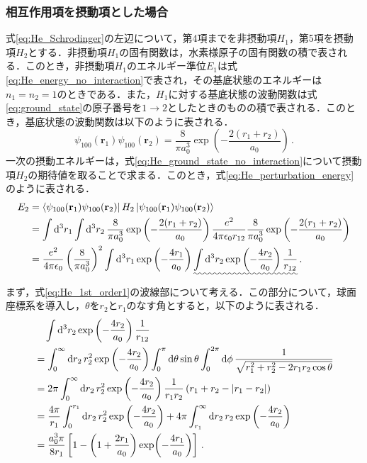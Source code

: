 \documentclass[a4paper,dvipdfmx,10.5pt]{jarticle}
\begin{document}
\subsubsection{相互作用項を摂動項とした場合}
式\eqref{eq:He_Schrodinger}の左辺について，第4項までを非摂動項$H_1$，第5項を摂動項$H_2$とする．非摂動項$H_1$の固有関数は，水素様原子の固有関数の積で表される．このとき，非摂動項$H_1$のエネルギー準位$E_1$は式\eqref{eq:He_energy_no_interaction}で表され，その基底状態のエネルギーは$n_1=n_2=1$のときである．また，$H_1$に対する基底状態の波動関数は式\eqref{eq:ground_state}の原子番号を$1\to 2$としたときのものの積で表される．このとき，基底状態の波動関数は以下のように表される．
\begin{equation}
  \psi_{100}(\mathbf{r}_1)\psi_{100}(\mathbf{r}_2) = \frac{8}{\pi a_0^3} \exp\left(-\frac{2(r_1 + r_2)}{a_0}\right)\,.\label{eq:He_ground_state_no_interaction} 
\end{equation}
一次の摂動エネルギーは，式\eqref{eq:He_ground_state_no_interaction}について摂動項$H_2$の期待値を取ることで求まる．このとき，式\eqref{eq:He_perturbation_energy}のように表される．
\begin{align}
  E_2&= \bra{\psi_{100}(\mathbf{r}_1)\psi_{100}(\mathbf{r}_2)} H_2 \ket{\psi_{100}(\mathbf{r}_1)\psi_{100}(\mathbf{r}_2)}\label{eq:He_perturbation_energy_1}\\
  &= \int \dd[3]{r_1} \int \dd[3]{r_2} \frac{8}{\pi a_0^3} \exp\left(-\frac{2(r_1 + r_2)}{a_0}\right) \frac{e^2}{4\pi \epsilon_0 r_{12}} \frac{8}{\pi a_0^3} \exp\left(-\frac{2(r_1 + r_2)}{a_0}\right)\\ 
  & = \frac{e^2}{4\pi \epsilon_0} \left( \frac{8}{\pi a_0^3}\right)^2 \int \dd[3]{r_1} \exp\left(-\frac{4r_1}{a_0}\right) \uwave{\int \dd[3]{r_2} \exp\left(-\frac{4r_2}{a_0}\right) \frac{1}{r_{12}}}\,.\label{eq:He_1st_order1}
\end{align}
まず，式\eqref{eq:He_1st_order1}の波線部について考える．この部分について，球面座標系を導入し，$\theta$を$r_2$と$r_1$のなす角とすると，以下のように表される．
\begin{align}
  &\quad \int \dd[3]{r_2} \exp\left(-\frac{4r_2}{a_0}\right) \frac{1}{r_{12}}\\
  &= \int_0^\infty \dd{r_2} r_2^2 \exp\left(-\frac{4r_2}{a_0}\right) \int_0^\pi \dd{\theta} \sin\theta \int_0^{2\pi} \dd{\phi} \frac{1}{\sqrt{r_1^2 + r_2^2 - 2r_1 r_2 \cos\theta}}\\
  &= 2\pi \int_0^\infty \dd{r_2} r_2^2 \exp\left(-\frac{4r_2}{a_0}\right) \frac{1}{r_1 r_2} \left(r_1+r_2 - \abs{r_1-r_2}\right)\\
  &= \frac{4\pi}{r_1} \int_0^{r_1} \dd{r_2} r_2^2 \exp\left(-\frac{4r_2}{a_0}\right) + 4\pi \int_{r_1}^\infty \dd{r_2} r_2 \exp\left(-\frac{4r_2}{a_0}\right)\\
  &= \frac{a_0^3\pi}{8r_1}\left[1-\left(1+\frac{2r_1}{a_0}\right)\exp(-\frac{4r_1}{a_0})\right] \,.
  \label{eq:He_1st_order2}
\end{align}
\end{document}
